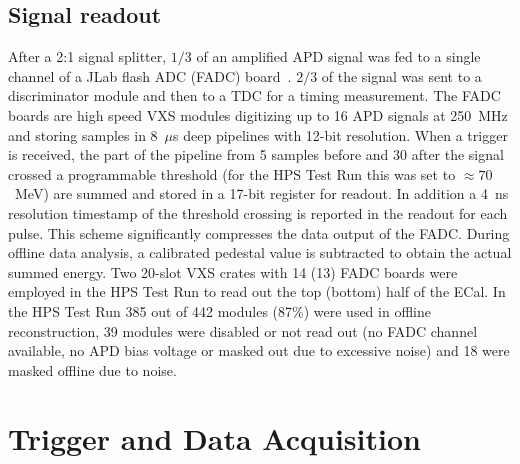 \documentclass[final,3p,times,twocolumn]{elsarticle}
\begin{document}
\subsection{Signal readout}
\label{sec:fadc}
After a 2:1 signal splitter, $1/3$ of an amplified APD signal was fed to a 
single channel of a JLab flash ADC (FADC) board~\cite{fadc}. $2/3$ of the signal was sent to a 
discriminator module and then to a TDC for a timing measurement. 
The FADC boards are high speed VXS modules digitizing up to 16 APD signals 
at 250~MHz and storing samples in 8~$\mu$s deep pipelines with 12-bit resolution. 
When a trigger is received, the part 
of the pipeline from 5 samples before and 30 after the signal crossed a programmable 
threshold (for the HPS Test Run this was set to $\approx70$~MeV) are 
summed and stored in a 17-bit register for readout. In addition a 4~ns resolution timestamp of the 
threshold crossing is reported in the readout for each pulse.
This scheme significantly compresses the data output of the FADC. During offline data analysis, a 
calibrated pedestal value is subtracted to obtain the actual summed energy.
Two 20-slot VXS crates with 14 (13) FADC boards were employed in the HPS Test Run to read out the 
top (bottom) half of the ECal.
In the HPS Test Run 385 out of 442 modules (87\%) were used in offline reconstruction, 39 modules 
were disabled or not read out (no FADC channel available, no APD bias voltage or masked out due to 
excessive noise) and 18 were masked offline due to noise. 




\section{Trigger and Data Acquisition}
\label{sec:triggerdaq}
\end{document}

